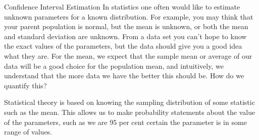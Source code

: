 
Confidence Interval Estimation
In statistics one often would like to estimate unknown parameters for a known distribution. For example, you may think that your parent population is normal, but the mean is unknown, or both the mean and standard deviation are unknown. From a data set you can't hope to know the exact values of the parameters, but the data should give you a good idea what they are. For the mean, we expect that the sample mean or average of our data will be a good choice for the population mean, and intuitively, we understand that the more data we have the better this should be. How do we quantify this?

Statistical theory is based on knowing the sampling distribution of some statistic such as the mean. This allows us to make probability statements about the value of the parameters, such as we are 95 per cent certain the parameter is in some range of values.
